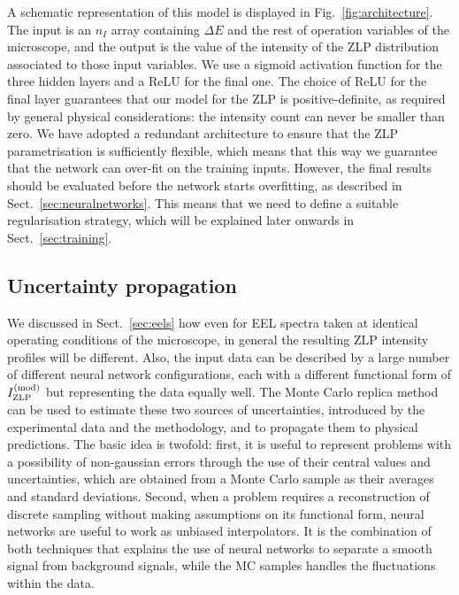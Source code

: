 A schematic representation of this model
is displayed in Fig.~\ref{fig:architecture}.
%
 The input is an $n_I$ array containing $\Delta E$ and the rest of
 operation variables of the microscope, and
 the output is the value of the intensity of the ZLP distribution
 associated to those input variables.
 We use a sigmoid activation function for the three hidden layers and a ReLU
 for the final one.
 The choice of ReLU for the final layer guarantees that our model for the ZLP
 is positive-definite, as required by general physical considerations: the intensity
 count can never be smaller than zero.
 We have adopted a redundant architecture to ensure that the ZLP parametrisation
 is sufficiently flexible, which means that this way we guarantee that
 the network can over-fit on the training inputs.
 However, the final results should be evaluated before the network starts overfitting,
 as described in Sect.~\ref{sec:neuralnetworks}. 
 This means that we need to define a suitable regularisation strategy, which 
 will be explained later onwards in Sect.~\ref{sec:training}.



\subsection{Uncertainty propagation}
\label{sec:uncertaintypropagation}

We discussed in Sect.~\ref{sec:eels} how
even for EEL spectra taken at identical operating conditions of the microscope,
in general the resulting ZLP intensity profiles will be different.
%
Also, the input data can be described by a large number of different neural 
network configurations, each with a different functional form of $I_{\rm ZLP}^{(\rm mod)}$
but representing the data equally well.
%
The Monte Carlo replica method can be used to estimate these two sources of 
uncertainties, introduced by the experimental data and the methodology,
and to propagate them to physical predictions.
%
The basic idea is twofold:
first, it is useful to represent problems with a possibility of non-gaussian errors
through the use of their central values and uncertainties, which are obtained from a Monte Carlo sample
as their averages and standard deviations.
%
Second, when a problem requires a reconstruction of discrete sampling without making assumptions on its 
functional form, neural networks are useful to work as unbiased interpolators. 
%
It is the combination of both techniques that explains the use of neural networks to separate a smooth
signal from background signals, while the MC samples handles the fluctuations within the data.

